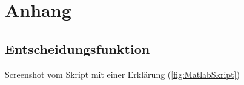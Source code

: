 \chapter{Anhang} \label{chap:Anhang}
\section{Entscheidungsfunktion} \label{Anh:Entscheidungsfunktion}
Screenshot vom Skript mit einer Erklärung (\autoref{fig:MatlabSkript})


